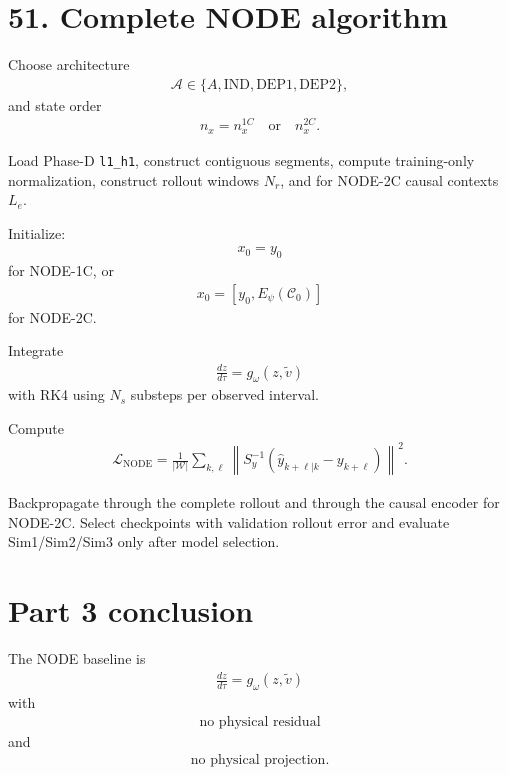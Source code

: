 \documentclass[11pt]{article}
\begin{document}
\section*{51. Complete NODE algorithm}

Choose architecture
\begin{align}
\boxed{
\mathcal A\in\{A,\mathrm{IND},\mathrm{DEP1},\mathrm{DEP2}\},
}
\end{align}
and state order
\begin{align}
\boxed{
n_x=n_x^{1C}\quad\text{or}\quad n_x^{2C}.
}
\end{align}

Load Phase-D \texttt{l1\_h1}, construct contiguous segments, compute training-only normalization, construct rollout windows \(N_r\), and for NODE-2C causal contexts \(L_e\).

Initialize:
\begin{align}
\boxed{x_0=y_0}
\end{align}
for NODE-1C, or
\begin{align}
\boxed{x_0=[y_0,E_\psi(\mathcal C_0)]}
\end{align}
for NODE-2C.

Integrate
\begin{align}
\boxed{
\frac{dz}{d\tau}=g_\omega(z,\widetilde v)
}
\end{align}
with RK4 using \(N_s\) substeps per observed interval.

Compute
\begin{align}
\boxed{
\mathcal L_{\mathrm{NODE}}
=
\frac{1}{|\mathcal W|}
\sum_{k,\ell}
\left\|
S_y^{-1}
(\widehat y_{k+\ell|k}-y_{k+\ell})
\right\|^2.
}
\tag{N3.161}
\end{align}

Backpropagate through the complete rollout and through the causal encoder for NODE-2C. Select checkpoints with validation rollout error and evaluate Sim1/Sim2/Sim3 only after model selection.

\section*{Part 3 conclusion}

The NODE baseline is
\begin{align}
\boxed{
\frac{dz}{d\tau}=g_\omega(z,\widetilde v)
}
\end{align}
with
\begin{align}
\boxed{\text{no physical residual}}
\end{align}
and
\begin{align}
\boxed{\text{no physical projection}.}
\end{align}
\end{document}
